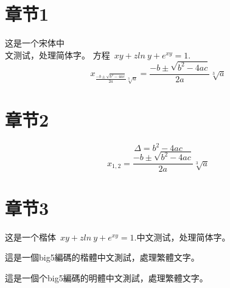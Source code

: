 \documentclass{article}
\begin{document}
		\begin{CJK}{UTF8}{gbsn}
    
    		\section{章节1}    		
			这是一个宋体中\\
			文测试，处理简体字。
			方程~$xy+zln~y+e^{xy} = 1. $ $$x_{\frac{-b \pm \sqrt{b^2 - 4ac}}{2a}\sqrt[3]{a}} = \frac{-b \pm \sqrt{b^2 - 4ac}}{2a}\sqrt[3]{a}$$
			\section{章节2}
			$$\Delta = b^2 - 4ac$$
    		$$x_{1,2} = \frac{-b \pm \sqrt{b^2 - 4ac}}{2a}\sqrt[3]{a}$$
			\section{章节3}	
    	\end{CJK}
   		\begin{CJK}{UTF8}{gkai}
    	这是一个楷体~$xy+zln~y+e^{xy} = 1. $中文测试，处理简体字。
    	\end{CJK}
    	
    	\begin{CJK}{UTF8}{bkai}
    	這是一個big5編碼的楷體中文測試，處理繁體文字。
    	\end{CJK}
    	
    	\begin{CJK}{UTF8}{bsmi}
    	這是一個个big5編碼的明體中文測試，處理繁體文字。
    	\end{CJK}
    
\end{document}
